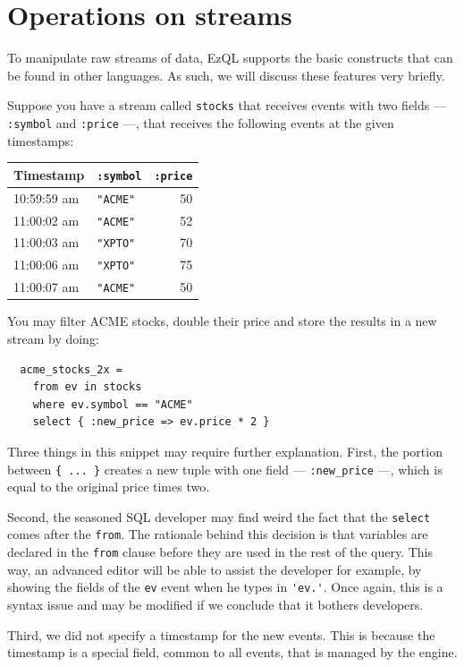 \documentclass{report}
\begin{document}
\section{Operations on streams}
\label{sec:stream-operations}

To manipulate raw streams of data, EzQL supports the basic constructs
that can be found in other languages. As such, we will discuss these
features very briefly.

Suppose you have a stream called \verb=stocks= that receives events
with two fields --- \verb=:symbol= and \verb=:price= ---, that
receives the following events at the given timestamps:

\begin{tabular}{ |l|l|r| }
  \hline
  Timestamp & \verb=:symbol= & \verb=:price= \\
  \hline
  10:59:59 am & \verb="ACME"= & 50 \\
  11:00:02 am & \verb="ACME"= & 52 \\
  11:00:03 am & \verb="XPTO"= & 70 \\
  11:00:06 am & \verb="XPTO"= & 75 \\
  11:00:07 am & \verb="ACME"= & 50 \\
  \hline
\end{tabular}

You may filter ACME stocks, double their price and store the results
in a new stream by doing:

\begin{lstlisting}
  acme_stocks_2x =
    from ev in stocks
    where ev.symbol == "ACME"
    select { :new_price => ev.price * 2 }
\end{lstlisting}

Three things in this snippet may require further explanation. First,
the portion between \verb={ ... }= creates a new tuple with one field
--- \verb=:new_price= ---, which is equal to the original price times
two.

Second, the seasoned SQL developer may find weird the fact that the
\verb=select= comes after the \verb=from=. The rationale behind this
decision is that variables are declared in the \verb=from= clause
before they are used in the rest of the query. This way, an advanced
editor will be able to assist the developer for example, by showing
the fields of the \verb=ev= event when he types in \verb='ev.'=. Once
again, this is a syntax issue and may be modified if we conclude that
it bothers developers.

Third, we did not specify a timestamp for the new events. This is
because the timestamp is a special field, common to all events, that
is managed by the engine.
\end{document}
